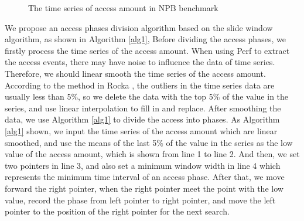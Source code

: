 \documentclass[a4paper,fleqn]{cas-sc}
\begin{document}
\begin{figure}[htbp]
{\begin{minipage}[t]{0.45\linewidth}
		\end{minipage}
	}%
	
	\centering
	\caption{The time series of access amount in NPB benchmark} \label{FIG:2}
\end{figure}

We propose an access phases division algorithm based on the slide window algorithm, as shown in Algorithm \ref{alg1}, Before dividing the access phases, we firstly process the time series of the access amount. When using Perf to extract the access events, there may have noise to influence the data of time series. Therefore, we should linear smooth the time series of the access amount. According to the method in Rocka \cite{19}, the outliers in the time series data are usually less than 5\%, so we delete the data with the top 5\% of the value in the series, and use linear interpolation to fill in and replace. After smoothing the data, we use Algorithm \ref{alg1} to divide the access into phases. As Algorithm \ref{alg1} shown, we input the time series of the access amount which are linear smoothed, and use the means of the last 5\% of the value in the series as the low value of the access amount, which is shown from line 1 to line 2. And then, we set two pointers in line 3, and also set a  minimum window width in line 4 which represents the minimum time interval of an access phase. After that, we move forward the right pointer, when the right pointer meet the point with the low value, record the phase from left pointer to right pointer, and move the left pointer to the position of the right pointer for the next search.
\end{document}

